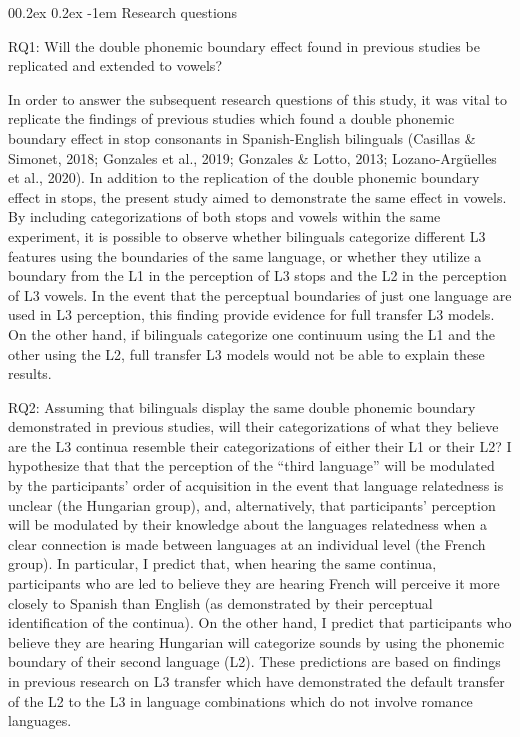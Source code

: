 \documentclass[
  man]{apa6}
\makeatletter
\let\oldparagraph\paragraph
\renewcommand{\paragraph}[1]{\oldparagraph{#1}\mbox{}}
\renewcommand{\paragraph}{\@startsection{paragraph}{4}{\parindent}%
  {0\baselineskip \@plus 0.2ex \@minus 0.2ex}%
  {-1em}%
  {\normalfont\normalsize\bfseries\itshape\typesectitle}}
\makeatother
\begin{document}
\hypertarget{research-questions}{%
\paragraph{Research questions}\label{research-questions}}

RQ1: Will the double phonemic boundary effect found in previous studies be replicated and extended to vowels?

In order to answer the subsequent research questions of this study, it was vital to replicate the findings of previous studies which found a double phonemic boundary effect in stop consonants in Spanish-English bilinguals (Casillas \& Simonet, 2018; Gonzales et al., 2019; Gonzales \& Lotto, 2013; Lozano-Argüelles et al., 2020). In addition to the replication of the double phonemic boundary effect in stops, the present study aimed to demonstrate the same effect in vowels. By including categorizations of both stops and vowels within the same experiment, it is possible to observe whether bilinguals categorize different L3 features using the boundaries of the same language, or whether they utilize a boundary from the L1 in the perception of L3 stops and the L2 in the perception of L3 vowels. In the event that the perceptual boundaries of just one language are used in L3 perception, this finding provide evidence for full transfer L3 models. On the other hand, if bilinguals categorize one continuum using the L1 and the other using the L2, full transfer L3 models would not be able to explain these results.

RQ2: Assuming that bilinguals display the same double phonemic boundary demonstrated in previous studies, will their categorizations of what they believe are the L3 continua resemble their categorizations of either their L1 or their L2?
I hypothesize that that the perception of the ``third language'' will be modulated by the participants' order of acquisition in the event that language relatedness is unclear (the Hungarian group), and, alternatively, that participants' perception will be modulated by their knowledge about the languages relatedness when a clear connection is made between languages at an individual level (the French group).
In particular, I predict that, when hearing the same continua, participants who are led to believe they are hearing French will perceive it more closely to Spanish than English (as demonstrated by their perceptual identification of the continua).
On the other hand, I predict that participants who believe they are hearing Hungarian will categorize sounds by using the phonemic boundary of their second language (L2).
These predictions are based on findings in previous research on L3 transfer which have demonstrated the default transfer of the L2 to the L3 in language combinations which do not involve romance languages.
\end{document}
